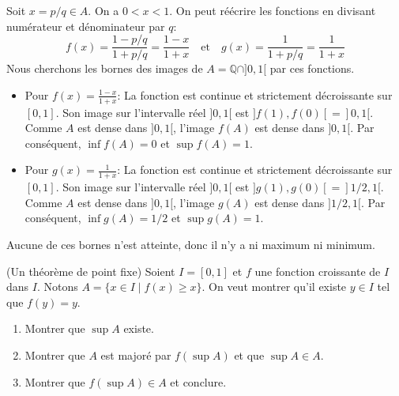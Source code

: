 \documentclass[solutions]{exercices}
\begin{document}
\begin{solution}
Soit $x = p/q \in A$. On a $0 < x < 1$. On peut réécrire les fonctions en divisant numérateur et dénominateur par $q$:
\[ f(x) = \frac{1 - p/q}{1 + p/q} = \frac{1-x}{1+x} \quad \text{et} \quad g(x) = \frac{1}{1+p/q} = \frac{1}{1+x} \]
Nous cherchons les bornes des images de $A = \mathbb{Q} \cap ]0,1[$ par ces fonctions.
\begin{itemize}
    \item Pour $f(x) = \frac{1-x}{1+x}$: La fonction est continue et strictement décroissante sur $[0,1]$. Son image sur l'intervalle réel $]0,1[$ est $]f(1), f(0)[ = ]0, 1[$. Comme $A$ est dense dans $]0,1[$, l'image $f(A)$ est dense dans $]0,1[$. Par conséquent, $\inf f(A) = 0$ et $\sup f(A) = 1$.
    \item Pour $g(x) = \frac{1}{1+x}$: La fonction est continue et strictement décroissante sur $[0,1]$. Son image sur l'intervalle réel $]0,1[$ est $]g(1), g(0)[ = ]1/2, 1[$. Comme $A$ est dense dans $]0,1[$, l'image $g(A)$ est dense dans $]1/2, 1[$. Par conséquent, $\inf g(A) = 1/2$ et $\sup g(A) = 1$.
\end{itemize}
Aucune de ces bornes n'est atteinte, donc il n'y a ni maximum ni minimum.
\end{solution}

\begin{exercice}[\st]
(Un théorème de point fixe) Soient $I = [0,1]$ et $f$ une fonction croissante de $I$ dans $I$. Notons $A = \{x \in I \mid f(x) \ge x\}$. On veut montrer qu'il existe $y \in I$ tel que $f(y) = y$.
\begin{enumerate}
    \item Montrer que $\sup A$ existe.
    \item Montrer que $A$ est majoré par $f(\sup A)$ et que $\sup A \in A$.
    \item Montrer que $f(\sup A) \in A$ et conclure.
\end{enumerate}
\end{exercice}
\end{document}
